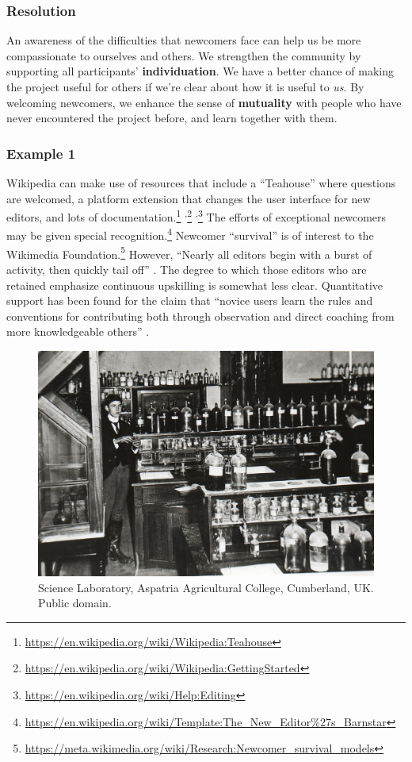 \subsubsection*{Resolution}
An awareness of the difficulties that newcomers face can
help us be more compassionate to ourselves and others.  We strengthen the community
by supporting all participants' \textbf{individuation}.  We have a better chance of making
the project useful for others if we're clear about how it is useful to \emph{us}.  By welcoming newcomers, we enhance the sense of \textbf{mutuality} with people who have never encountered the project before, and learn together with them.

\subsubsection*{Example 1} Wikipedia  can make use of resources that
include a ``Teahouse'' where questions are welcomed, a platform
extension that changes the user interface for new editors, and lots of
documentation.\footnote{\url{https://en.wikipedia.org/wiki/Wikipedia:Teahouse}}%
\textsuperscript{,}\footnote{\url{https://en.wikipedia.org/wiki/Wikipedia:GettingStarted}}%
\textsuperscript{,}\footnote{\url{https://en.wikipedia.org/wiki/Help:Editing}}
The efforts of exceptional newcomers may be given special
recognition.\footnote{\url{https://en.wikipedia.org/wiki/Template:The_New_Editor\%27s_Barnstar}}
Newcomer ``survival'' is of interest to the Wikimedia
Foundation.\footnote{\url{https://meta.wikimedia.org/wiki/Research:Newcomer_survival_models}}
However, ``Nearly all editors begin with a burst of activity, then
quickly tail off'' \cite{panciera2009wikipedians}.  The degree to
which those editors who are retained emphasize continuous upskilling
is somewhat less clear.  Quantitative support has been found
\cite{panciera2009wikipedians} for the claim that ``novice users learn
the rules and conventions for contributing both through observation
and direct coaching from more knowledgeable others'' \cite{bryant2005becoming}.

\begin{figure}
\vspace{-1cm}
\begin{center}
\includegraphics[width=.45\textwidth]{The_Science_Laboratory}
\end{center}
\vspace{-.5cm}
\caption{Science Laboratory, Aspatria Agricultural College, Cumberland, UK. Public
  domain.\label{science-laboratory}}
\vspace{-.6cm}
\end{figure}

